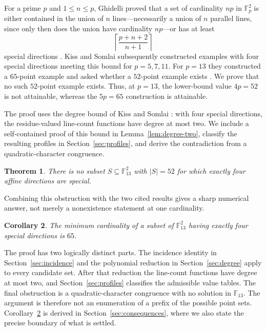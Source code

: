 \documentclass[10pt,a4paper]{amsart}
\newtheorem{theorem}{Theorem}[section]
\newtheorem{corollary}[theorem]{Corollary}
\newcommand{\F}{\mathbb F}
\begin{document}
For a prime $p$ and $1\le n\le p$, Ghidelli proved that a set of cardinality
$np$ in $\F_p^2$ is either
contained in the union of $n$ lines---necessarily a union of $n$ parallel
lines, since only then does the union have cardinality $np$---or has at least
\begin{equation}\label{eq:ghidelli-bound}
  \left\lceil\frac{p+n+2}{n+1}\right\rceil
\end{equation}
special directions \cite[Theorem~1.3]{GhidelliRichPoor}.  Kiss and Somlai
subsequently constructed examples with four special directions meeting this
bound for $p=5,7,11$.  For $p=13$ they constructed a $65$-point example and
asked whether a $52$-point example exists
\cite[Section~6]{KissSomlaiSpecialDirections}.  We prove that no such
$52$-point example exists.  Thus, at $p=13$, the lower-bound value $4p=52$ is not
attainable, whereas the $5p=65$ construction is attainable.

The proof uses the degree bound of Kiss and Somlai
\cite[Proposition~3.1]{KissSomlaiSpecialDirections}: with four special
directions, the residue-valued line-count functions have degree at most two.
We include a self-contained proof of this bound in
Lemma~\ref{lem:degree-two}, classify the resulting profiles in
Section~\ref{sec:profiles}, and derive the contradiction from a
quadratic-character congruence.


\begin{theorem}\label{thm:main}
There is no subset $S\subseteq\F_{13}^{2}$ with $|S|=52$ for which exactly
four affine directions are special.
\end{theorem}


Combining this obstruction with the two cited results gives a sharp numerical
answer, not merely a nonexistence statement at one cardinality.

\begin{corollary}\label{cor:minimum}
The minimum cardinality of a subset of $\F_{13}^{2}$ having exactly four
special directions is $65$.
\end{corollary}

The proof has two logically distinct parts.  The incidence identity in
Section~\ref{sec:incidence} and the polynomial reduction in
Section~\ref{sec:degree} apply to every candidate set.  After that reduction
the line-count functions have degree at most two, and
Section~\ref{sec:profiles} classifies the admissible value tables.  The final
obstruction is a quadratic-character congruence with no solution in
$\F_{13}$.  The argument is therefore not an enumeration of a prefix of the
possible point sets.  Corollary~\ref{cor:minimum} is derived in
Section~\ref{sec:consequences}, where we also state the precise boundary of
what is settled.
\end{document}
